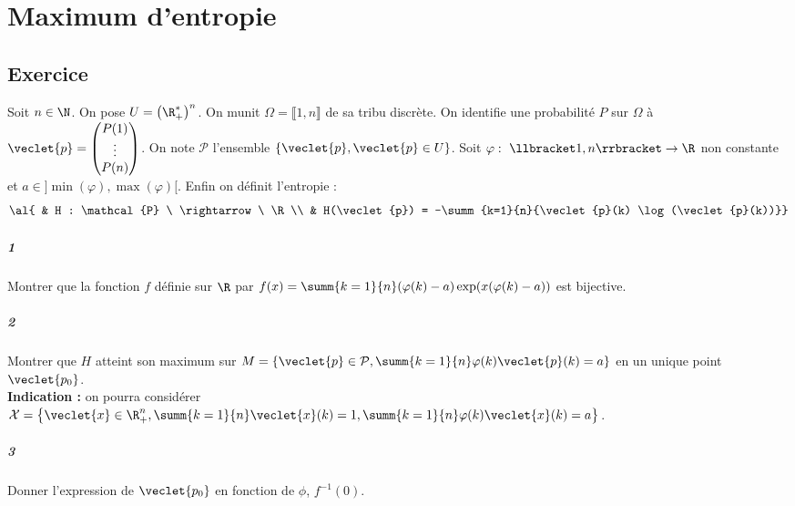 \documentclass[10pt,a4paper]{article} 
\begin{document}
\section{Maximum d'entropie}
\subsection{Exercice}
Soit $n \in \N$. On pose $U = \left(\R_+^* \right)^n$.
On munit $\Omega = \llbracket 1,n \rrbracket$ de sa tribu discrète.
On identifie une probabilité $P$ sur $\Omega$ à $\veclet{p} = \left( \begin{matrix} P(1) \\ \vdots \\ P(n) \end{matrix} \right)$. On note $\mathcal{P}$ l'ensemble $\left\lbrace \veclet{p}, \veclet{p} \in U \right\rbrace$.
Soit $\varphi : \ \llbracket 1,n \rrbracket \rightarrow \R$ non constante et $a \in ]\min(\varphi), \max(\varphi)[$. Enfin on définit l'entropie :
\[\al{
   & H : \mathcal{P} \ \rightarrow \ \R \\
   & H(\veclet{p}) = -\summ{k=1}{n}{\veclet{p}(k) \log(\veclet{p}(k))}}\]
\subparagraph{1} Montrer que la fonction $f$ définie sur $\R$ par
$f(x) = \summ{k = 1}{n}(\varphi(k) - a)\exp(x(\varphi(k) - a))$ est bijective.
\subparagraph{2} Montrer que $H$ atteint son maximum sur
$M = \left\lbrace \veclet{p} \in \mathcal{P}, \summ{k=1}{n}\varphi(k) \veclet{p}(k) = a
\right\rbrace$ en un unique point $\veclet{p_0}$. \\
\textbf{Indication :} on pourra considérer $\mathcal{X} = \left\lbrace \veclet{x} \in \R_+^n, \summ{k=1}{n}\veclet{x}(k) = 1, \summ{k=1}{n} \varphi(k) \veclet{x}(k) = a \right\rbrace$.
\subparagraph{3} Donner
l'expression de $\veclet{p_0}$ en fonction de $\phi$, $f^{-1}(0)$.
\end{document}
